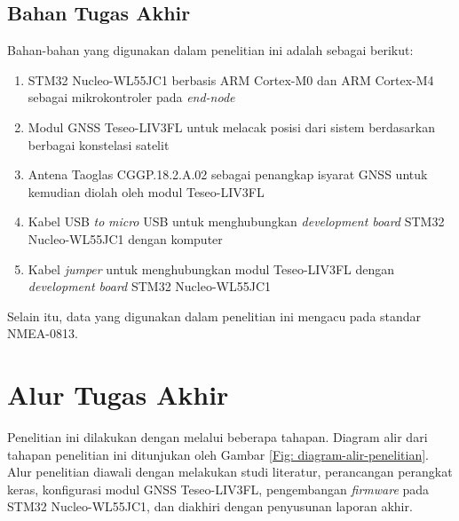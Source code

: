 \subsection{Bahan Tugas Akhir}
Bahan-bahan yang digunakan dalam penelitian ini adalah sebagai berikut:
\begin{enumerate}
	\item STM32 Nucleo-WL55JC1 berbasis ARM Cortex-M0 dan ARM Cortex-M4 sebagai mikrokontroler pada \textit{end-node}
	\item Modul GNSS Teseo-LIV3FL untuk melacak posisi dari sistem berdasarkan berbagai konstelasi satelit
	\item Antena Taoglas CGGP.18.2.A.02 sebagai penangkap isyarat GNSS untuk kemudian diolah oleh modul Teseo-LIV3FL
	\item Kabel USB \textit{to} \textit{micro} USB untuk menghubungkan \textit{development board} STM32 Nucleo-WL55JC1 dengan komputer
	\item Kabel \textit{jumper} untuk menghubungkan modul Teseo-LIV3FL dengan \textit{development board} STM32 Nucleo-WL55JC1
\end{enumerate}
Selain itu, data yang digunakan dalam penelitian ini mengacu pada standar NMEA-0813.

\section{Alur Tugas Akhir}
Penelitian ini dilakukan dengan melalui beberapa tahapan. Diagram alir dari tahapan penelitian ini ditunjukan oleh Gambar \ref{Fig: diagram-alir-penelitian}. Alur penelitian diawali dengan melakukan studi literatur, perancangan perangkat keras, konfigurasi modul GNSS Teseo-LIV3FL, pengembangan \textit{firmware} pada STM32 Nucleo-WL55JC1, dan diakhiri dengan penyusunan laporan akhir.

